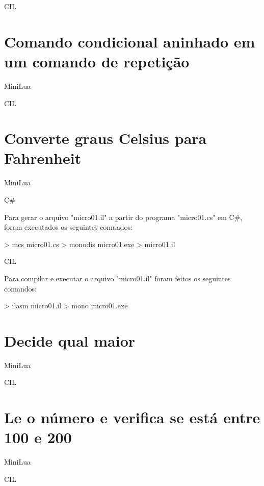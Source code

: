 \documentclass[12pt,a4paper]{report}
\begin{document}
CIL




\section{Comando condicional aninhado em um comando de repetição}
MiniLua


CIL



\section{Converte graus Celsius para Fahrenheit }
MiniLua


C\#


Para gerar o arquivo "micro01.il" a partir do programa "micro01.cs" em C\#, foram executados os seguintes comandos:

\begin{terminal}
> mcs micro01.cs
> monodis micro01.exe > micro01.il
\end{terminal}

CIL



Para compilar e executar o arquivo "micro01.il" foram feitos os seguintes comandos:

\begin{terminal}
> ilasm micro01.il
> mono micro01.exe
\end{terminal}



\section{Decide qual maior }
MiniLua

CIL




\section{Le o número e verifica se está entre 100 e 200 }
MiniLua

CIL

\end{document}
